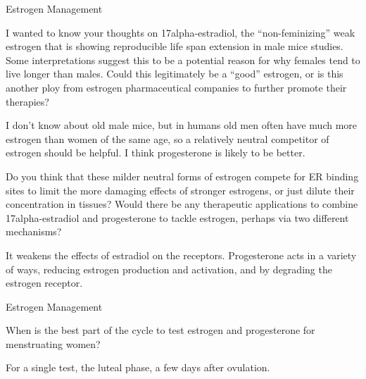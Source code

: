 \documentclass[11pt,oneside,openany,extrafontsizes]{memoir}
\begin{document}
\begin{emailexchange}{Estrogen Management}

    \begin{question}
        I wanted to know your thoughts on 17alpha-estradiol, the \enquote{non-feminizing} weak estrogen that is showing reproducible life span extension in male mice studies. Some interpretations suggest this to be a potential reason for why females tend to live longer than males. Could this legitimately be a \enquote{good} estrogen, or is this another ploy from estrogen pharmaceutical companies to further promote their therapies?
    \end{question}

    \begin{answer}
       I don't know about old male mice, but in humans old men often have much more estrogen than women of the same age, so a relatively neutral competitor of estrogen should be helpful. I think progesterone is likely to be better.
    \end{answer}

    \begin{question}
        Do you think that these milder neutral forms of estrogen compete for ER binding sites to limit the more damaging effects of stronger estrogens, or just dilute their concentration in tissues? Would there be any therapeutic applications to combine 17alpha-estradiol and progesterone to tackle estrogen, perhaps via two different mechanisms?
    \end{question}

    \begin{answer}
      It weakens the effects of estradiol on the receptors. Progesterone acts in a variety of ways, reducing estrogen production and activation, and by degrading the estrogen receptor.
    \end{answer}
\end{emailexchange}

\begin{qaexchange}{Estrogen Management}

    \begin{question}
        When is the best part of the cycle to test estrogen and progesterone for menstruating women?
    \end{question}

    \begin{answer}
      For a single test, the luteal phase, a few days after ovulation.
    \end{answer}
\end{qaexchange}
\end{document}
